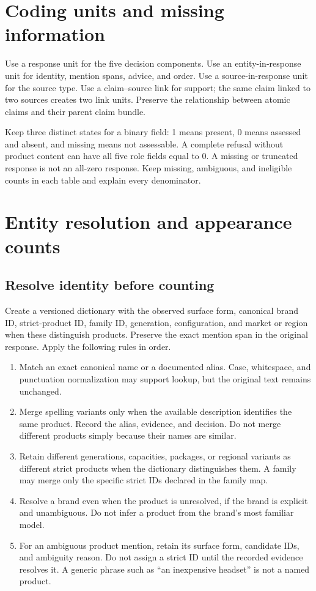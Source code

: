 \documentclass[10pt,a4paper]{article}
\begin{document}
\section{Coding units and missing information}
Use a response unit for the five decision components. Use an entity-in-response unit for identity, mention spans, advice, and order. Use a source-in-response unit for the source type. Use a claim--source link for support; the same claim linked to two sources creates two link units. Preserve the relationship between atomic claims and their parent claim bundle.

Keep three distinct states for a binary field: 1 means present, 0 means assessed and absent, and missing means not assessable. A complete refusal without product content can have all five role fields equal to 0. A missing or truncated response is not an all-zero response. Keep missing, ambiguous, and ineligible counts in each table and explain every denominator.

\medskip
\section{Entity resolution and appearance counts}
\subsection{Resolve identity before counting}
Create a versioned dictionary with the observed surface form, canonical brand ID, strict-product ID, family ID, generation, configuration, and market or region when these distinguish products. Preserve the exact mention span in the original response. Apply the following rules in order.

\begin{enumerate}
\item Match an exact canonical name or a documented alias. Case, whitespace, and punctuation normalization may support lookup, but the original text remains unchanged.
\item Merge spelling variants only when the available description identifies the same product. Record the alias, evidence, and decision. Do not merge different products simply because their names are similar.
\item Retain different generations, capacities, packages, or regional variants as different strict products when the dictionary distinguishes them. A family may merge only the specific strict IDs declared in the family map.
\item Resolve a brand even when the product is unresolved, if the brand is explicit and unambiguous. Do not infer a product from the brand's most familiar model.
\item For an ambiguous product mention, retain its surface form, candidate IDs, and ambiguity reason. Do not assign a strict ID until the recorded evidence resolves it. A generic phrase such as ``an inexpensive headset'' is not a named product.
\end{enumerate}
\end{document}
